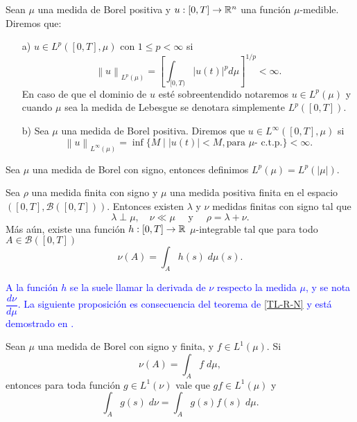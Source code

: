 \begin{defi} 
	Sean $\mu$ una medida de Borel positiva  y  $u:[0,T]\to \mathbb{R}^n$ una función $\mu$-medible. Diremos que:
	\begin{enumerate}
		\item [a)] $u\in L^p([0,T],\mu)$   con $1\leq p<\infty$ si 
		 $$\left\| u\right\|_{L^p(\mu)} =\left[ \int_{[0,T)}|u(t)|^p d\mu\right] ^{1/p}<\infty.$$
		En caso de que el dominio de $u$ esté sobreentendido notaremos $u\in L^p(\mu)$ y cuando $\mu$ sea la medida de Lebesgue se denotara simplemente $L^p([0,T])$.
  
		\item [b)] Sea $\mu$ una medida de Borel positiva. Diremos que  $u\in L^\infty([0,T],\mu)$ si 
		$$\left\| u\right\|_{L^\infty(\mu)}=\inf\{M \mid |u(t)|<M, \text{para } \mu \text{- c.t.p.}\}  <\infty.$$
		
	\end{enumerate}
\end{defi}
\begin{defi}
	Sea $\mu$ una medida de Borel con signo, entonces definimos $L^p(\mu)=L^p(|\mu|)$.
\end{defi}




\begin{thm}\label{TL-R-N}
	Sea $\rho$ una medida finita con signo y $\mu$ una medida positiva finita en el espacio $\left( [0,T], \mathscr{B}([0,T])\right) $. Entonces existen $\lambda$ y $\nu$ medidas finitas con signo tal que 
	\begin{equation*}
		\lambda\perp\mu, \quad \nu\ll\mu  \quad \text{ y }\quad \rho=\lambda+\nu.
	\end{equation*}
Más aún, existe una función $h:[0,T]\to\mathbb{R}$ $\mu$-integrable tal que para todo $A\in \mathscr{B}([0,T])$
\begin{equation*}
	\nu(A)=\int_A h(s)\;d\mu(s).
\end{equation*}
\end{thm}
\textcolor{blue}{A la función $h$ se la suele llamar la derivada de $\nu$ respecto la medida $\mu$, y se nota  $\dfrac{d\nu}{d\mu}$.
La siguiente proposición es consecuencia del teorema de \ref{TL-R-N} y está demostrado en \cite[Proposición 3.9]{folland}.}




\begin{prop}
    \label{ob1}
	Sean $\mu$ una medida de Borel con signo y finita, y  $f\in L^1(\mu)$. Si   $$\nu(A)=\int_A f\; d\mu,$$ entonces para toda función $g\in L^1(\nu)$ vale que $gf\in L^1(\mu)$ y 
	\begin{equation*}
	    \int_A g(s)\;d\nu=\int_Ag(s)f(s)\;d\mu.
	\end{equation*}

\end{prop}



